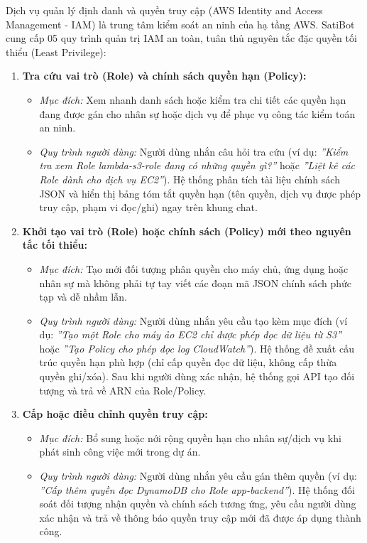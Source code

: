 \documentclass[a4paper,12pt]{article}
\begin{document}
Dịch vụ quản lý định danh và quyền truy cập (AWS Identity and Access Management - IAM) là trung tâm kiểm soát an ninh của hạ tầng AWS. SatiBot cung cấp 05 quy trình quản trị IAM an toàn, tuân thủ nguyên tắc đặc quyền tối thiểu (Least Privilege):

\begin{enumerate}
  \item \textbf{Tra cứu vai trò (Role) và chính sách quyền hạn (Policy):}
  \begin{itemize}
    \item \textit{Mục đích:} Xem nhanh danh sách hoặc kiểm tra chi tiết các quyền hạn đang được gán cho nhân sự hoặc dịch vụ để phục vụ công tác kiểm toán an ninh.
    \item \textit{Quy trình người dùng:} Người dùng nhắn câu hỏi tra cứu (ví dụ: \textit{''Kiểm tra xem Role lambda-s3-role đang có những quyền gì?''} hoặc \textit{''Liệt kê các Role dành cho dịch vụ EC2''}). Hệ thống phân tích tài liệu chính sách JSON và hiển thị bảng tóm tắt quyền hạn (tên quyền, dịch vụ được phép truy cập, phạm vi đọc/ghi) ngay trên khung chat.
  \end{itemize}

  \item \textbf{Khởi tạo vai trò (Role) hoặc chính sách (Policy) mới theo nguyên tắc tối thiểu:}
  \begin{itemize}
    \item \textit{Mục đích:} Tạo mới đối tượng phân quyền cho máy chủ, ứng dụng hoặc nhân sự mà không phải tự tay viết các đoạn mã JSON chính sách phức tạp và dễ nhầm lẫn.
    \item \textit{Quy trình người dùng:} Người dùng nhắn yêu cầu tạo kèm mục đích (ví dụ: \textit{''Tạo một Role cho máy ảo EC2 chỉ được phép đọc dữ liệu từ S3''} hoặc \textit{''Tạo Policy cho phép đọc log CloudWatch''}). Hệ thống đề xuất cấu trúc quyền hạn phù hợp (chỉ cấp quyền đọc dữ liệu, không cấp thừa quyền ghi/xóa). Sau khi người dùng xác nhận, hệ thống gọi API tạo đối tượng và trả về ARN của Role/Policy.
  \end{itemize}

  \item \textbf{Cấp hoặc điều chỉnh quyền truy cập:}
  \begin{itemize}
    \item \textit{Mục đích:} Bổ sung hoặc nới rộng quyền hạn cho nhân sự/dịch vụ khi phát sinh công việc mới trong dự án.
    \item \textit{Quy trình người dùng:} Người dùng nhắn yêu cầu gán thêm quyền (ví dụ: \textit{''Cấp thêm quyền đọc DynamoDB cho Role app-backend''}). Hệ thống đối soát đối tượng nhận quyền và chính sách tương ứng, yêu cầu người dùng xác nhận và trả về thông báo quyền truy cập mới đã được áp dụng thành công.
  \end{itemize}


\end{enumerate}
\end{document}
